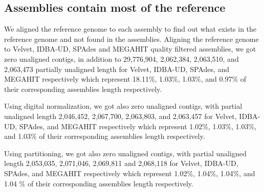    
\subsection*{Assemblies contain most of the reference} 
We aligned the reference genome to each assembly to find out what exists in the reference genome and not found in the assemblies. 
Aligning the reference genome to Velvet, IDBA-UD, SPAdes and MEGAHIT quality filtered assemblies, we got zero unaligned contigs, in addition to 29,776,904, 2,062,384, 2,063,510, and 2,063,473 partially unaligned length for Velvet, IDBA-UD, SPAdes, and MEGAHIT respectively which represent 18.11\%, 1.03\%, 1.03\%, and 0.97\% of their corresponding assemblies length respectively. 


Using digital normalization, we got also zero unaligned contigs, with partial unaligned length 2,046,452, 2,067,700, 2,063,803, and 2,063,457 for Velvet, IDBA-UD, SPAdes, and MEGAHIT respectively which represent 1.02\%, 1.03\%, 1.03\%, and 1.03\% of their corresponding assemblies length respectively.


Using partitioning, we got also zero unaligned contigs, with partial unaligned length 2,053,035, 2,071,046, 2,069,811 and 2,068,118 for Velvet, IDBA-UD, SPAdes, and MEGAHIT respectively which represent 1.02\%, 1.04\%, 1.04\%, and 1.04 \% of their corresponding assemblies length respectively. 



